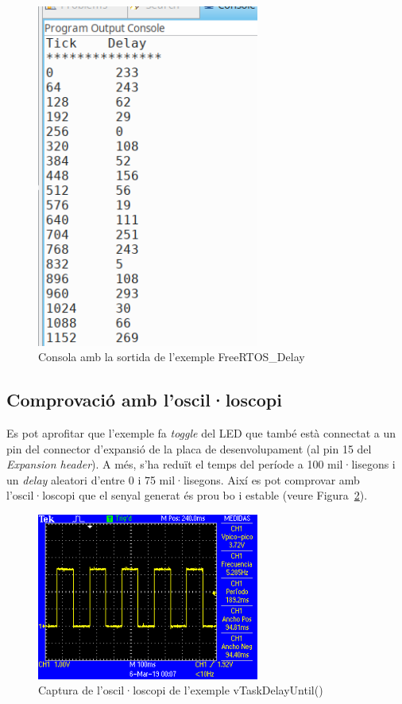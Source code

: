 \begin{figure}
 \centering
 \includegraphics[width=0.65\textwidth, keepaspectratio]{imatges/TaskDelayUntilConsole.png}
 \caption{Consola amb la sortida de l'exemple FreeRTOS\_Delay}
 \label{fig:TaskDelayConsole}
\end{figure}

\subsection{Comprovació amb l'oscil·loscopi}
Es pot aprofitar que l'exemple  fa {\em toggle} del LED que també està connectat a un pin del connector d'expansió de la placa de desenvolupament (al pin 15 del {\em Expansion header}).
A més, s'ha reduït el temps del període a 100 mil·lisegons i un {\em delay} aleatori d'entre 0 i 75 mil·lisegons. Així es pot comprovar amb l'oscil·loscopi que el senyal generat és prou bo i estable (veure Figura~\ref{fig:DelayUntil}).

\begin{figure}
 \centering
 \includegraphics[width=0.65\textwidth, keepaspectratio]{imatges/DelayUntil.png}
 \caption{Captura de l'oscil·loscopi de l'exemple vTaskDelayUntil()}
 \label{fig:DelayUntil}
\end{figure}

